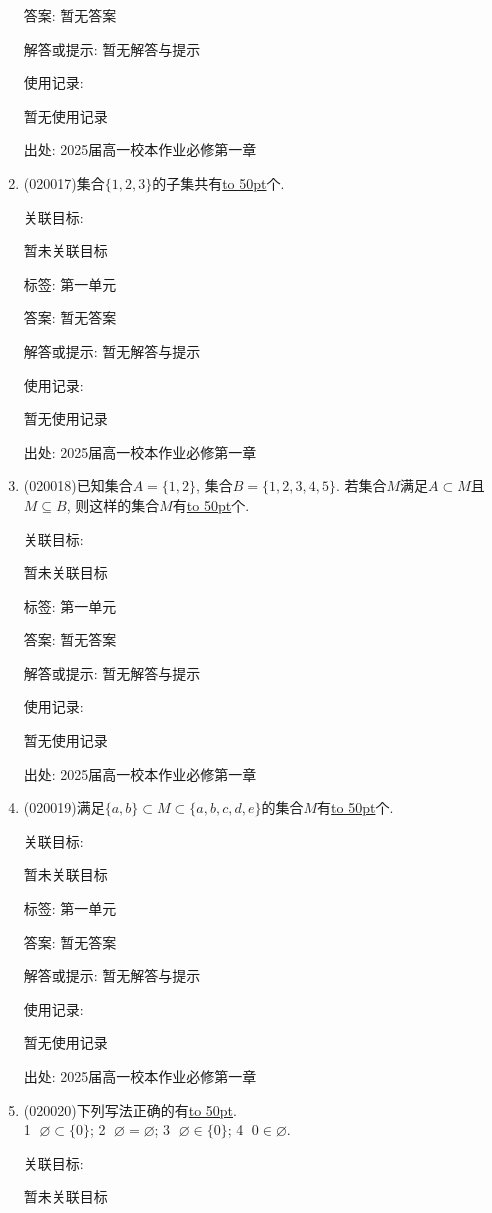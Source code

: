 \documentclass[10pt,a4paper]{article}
\newcommand{\blank}[1]{\underline{\hbox to #1pt{}}}
\begin{document}
\begin{enumerate}[1.]
答案: 暂无答案

解答或提示: 暂无解答与提示

使用记录:

暂无使用记录


出处: 2025届高一校本作业必修第一章
\item { (020017)}集合$\{1,2,3\}$的子集共有\blank{50}个.


关联目标:

暂未关联目标



标签: 第一单元

答案: 暂无答案

解答或提示: 暂无解答与提示

使用记录:

暂无使用记录


出处: 2025届高一校本作业必修第一章
\item { (020018)}已知集合$A=\{1,2\}$, 集合$B=\{1,2,3,4,5\}$. 若集合$M$满足$A\subset M$且$M\subseteq B$, 则这样的集合$M$有\blank{50}个.


关联目标:

暂未关联目标



标签: 第一单元

答案: 暂无答案

解答或提示: 暂无解答与提示

使用记录:

暂无使用记录


出处: 2025届高一校本作业必修第一章
\item { (020019)}满足$\{a, b\}\subset M \subset\{a, b, c, d, e\}$的集合$M$有\blank{50}个.


关联目标:

暂未关联目标



标签: 第一单元

答案: 暂无答案

解答或提示: 暂无解答与提示

使用记录:

暂无使用记录


出处: 2025届高一校本作业必修第一章
\item { (020020)}下列写法正确的有\blank{50}.\\
\textcircled{1} $\varnothing\subset\{0\}$; \textcircled{2} $\varnothing=\varnothing$; \textcircled{3} $\varnothing\in\{0\}$; \textcircled{4} $0\in\varnothing$.


关联目标:

暂未关联目标




\end{enumerate}
\end{document}
